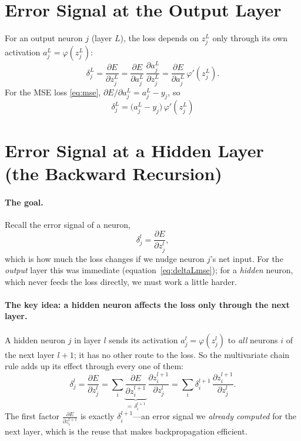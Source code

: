 \documentclass[11pt,a4paper]{report}
\theoremstyle{definition}
\theoremstyle{remark}
\newcommand{\pd}[2]{\frac{\partial #1}{\partial #2}}
\begin{document}
\section{Error Signal at the Output Layer}
For an output neuron $j$ (layer $L$), the loss depends on $z^{L}_{j}$ only
through its own activation $a^{L}_{j}=\varphi(z^{L}_{j})$:
\begin{equation}
\delta^{L}_{j}=\pd{E}{z^{L}_{j}}
=\pd{E}{a^{L}_{j}}\,\pd{a^{L}_{j}}{z^{L}_{j}}
=\pd{E}{a^{L}_{j}}\,\varphi'(z^{L}_{j}).
\label{eq:deltaL}
\end{equation}
For the MSE loss \eqref{eq:mse}, $\partial E/\partial a^{L}_{j}=a^{L}_{j}-y_j$,
so
\begin{equation}
\boxed{\ \delta^{L}_{j}=\bigl(a^{L}_{j}-y_j\bigr)\,\varphi'(z^{L}_{j})\ }
\label{eq:deltaLmse}
\end{equation}

\section{Error Signal at a Hidden Layer (the Backward Recursion)}
\paragraph{The goal.} Recall the error signal of a neuron,
\[
\delta^{l}_{j}=\pd{E}{z^{l}_{j}},
\]
which is how much the loss changes if we nudge neuron $j$'s net input. For the
\emph{output} layer this was immediate (equation~\eqref{eq:deltaLmse}); for a
\emph{hidden} neuron, which never feeds the loss directly, we must work a little
harder.

\paragraph{The key idea: a hidden neuron affects the loss only through the next
layer.} A hidden neuron $j$ in layer $l$ sends its activation
$a^{l}_{j}=\varphi(z^{l}_{j})$ to \emph{all} neurons $i$ of the next layer $l+1$;
it has no other route to the loss. So the multivariate chain rule adds up its
effect through every one of them:
\begin{equation}
\delta^{l}_{j}=\pd{E}{z^{l}_{j}}
=\sum_{i}\underbrace{\pd{E}{z^{l+1}_{i}}}_{=\,\delta^{l+1}_{i}}\,
   \pd{z^{l+1}_{i}}{z^{l}_{j}}
=\sum_{i}\delta^{l+1}_{i}\,\pd{z^{l+1}_{i}}{z^{l}_{j}}.
\label{eq:hid1}
\end{equation}
The first factor $\pd{E}{z^{l+1}_{i}}$ is exactly $\delta^{l+1}_{i}$---an error
signal we \emph{already computed} for the next layer, which is the reuse that
makes backpropagation efficient.
\end{document}

